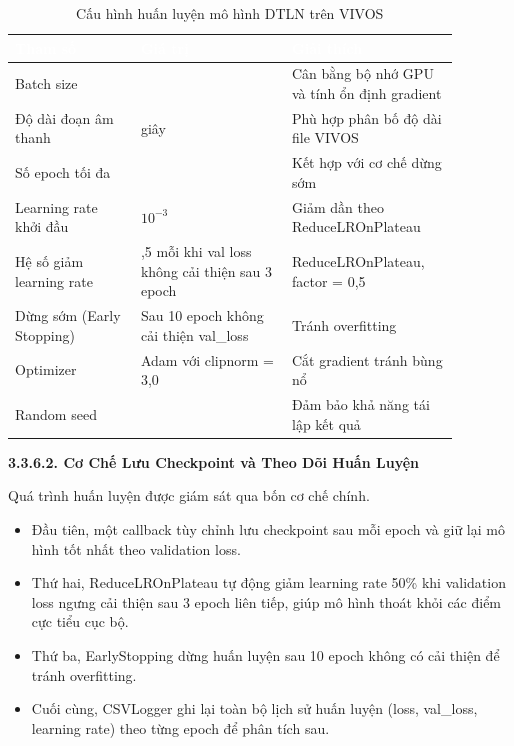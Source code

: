 \documentclass[
  13pt,
]{article}
\providecommand{\tightlist}{%
  \setlength{\itemsep}{0pt}\setlength{\parskip}{0pt}}
\begin{document}
\begin{table}[htbp]
\centering
\caption{Cấu hình huấn luyện mô hình DTLN trên VIVOS}
\label{tab:training-config}
\begin{tabular}{>{\raggedright\arraybackslash}p{0.25\linewidth} >{\centering\arraybackslash}p{0.3\linewidth} >{\raggedright\arraybackslash}p{0.33\linewidth}}
\toprule
\rowcolor{headerblue} \textcolor{white}{\textbf{Tham số}} & \textcolor{white}{\textbf{Giá trị}} & \textcolor{white}{\textbf{Giải thích}} \\
\midrule
\rowcolor{rowgray} Batch size & 32 & Cân bằng bộ nhớ GPU và tính ổn định gradient \\
Độ dài đoạn âm thanh & 3 giây & Phù hợp phân bố độ dài file VIVOS \\
\rowcolor{rowgray} Số epoch tối đa & 50 & Kết hợp với cơ chế dừng sớm \\
Learning rate khởi đầu & $10^{-3}$ & Giảm dần theo ReduceLROnPlateau \\
\rowcolor{rowgray} Hệ số giảm learning rate & 0,5 mỗi khi val loss không cải thiện sau 3 epoch & ReduceLROnPlateau, factor = 0,5 \\
Dừng sớm (Early Stopping) & Sau 10 epoch không cải thiện val\_loss & Tránh overfitting \\
\rowcolor{rowgray} Optimizer & Adam với clipnorm = 3,0 & Cắt gradient tránh bùng nổ \\
Random seed & 42 & Đảm bảo khả năng tái lập kết quả \\
\bottomrule
\end{tabular}
\end{table}

\textbf{3.3.6.2. Cơ Chế Lưu Checkpoint và Theo Dõi Huấn Luyện}

Quá trình huấn luyện được giám sát qua bốn cơ chế chính.

\begin{itemize}
\tightlist
\item
  Đầu tiên, một callback tùy chỉnh lưu checkpoint sau mỗi epoch và giữ
  lại mô hình tốt nhất theo validation loss.\\
\item
  Thứ hai, ReduceLROnPlateau tự động giảm learning rate 50\% khi
  validation loss ngưng cải thiện sau 3 epoch liên tiếp, giúp mô hình
  thoát khỏi các điểm cực tiểu cục bộ.\\
\item
  Thứ ba, EarlyStopping dừng huấn luyện sau 10 epoch không có cải thiện
  để tránh overfitting.\\
\item
  Cuối cùng, CSVLogger ghi lại toàn bộ lịch sử huấn luyện (loss,
  val\_loss, learning rate) theo từng epoch để phân tích sau.
\end{itemize}
\end{document}
